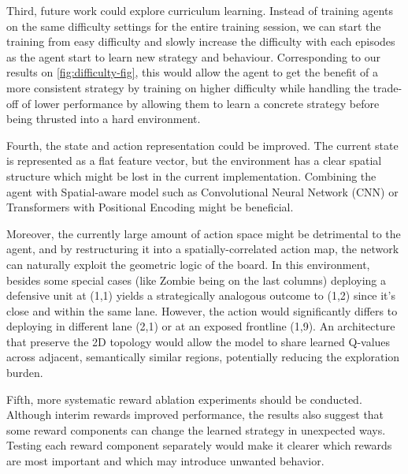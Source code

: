 \documentclass[conference,onecolumn]{IEEEtran}
\begin{document}
Third, future work could explore curriculum learning. Instead of training agents on the same difficulty settings for the entire training session, we can start the training from easy difficulty and slowly increase the difficulty with each episodes as the agent start to learn new strategy and behaviour. Corresponding to our results on \ref{fig:difficulty-fig}, this would allow the agent to get the benefit of a more consistent strategy by training on higher difficulty while handling the trade-off of lower performance by allowing them to learn a concrete strategy before being thrusted into a hard environment.

Fourth, the state and action representation could be improved. The current state is represented as a flat feature vector, but the environment has a clear spatial structure which might be lost in the current implementation. Combining the agent with Spatial-aware model such as Convolutional Neural Network (CNN) or Transformers with Positional Encoding might be beneficial. 

Moreover, the currently large amount of action space might be detrimental to the agent, and by restructuring it into a spatially-correlated action map, the network can naturally exploit the geometric logic of the board. In this environment, besides some special cases (like Zombie being on the last columns) deploying a defensive unit at (1,1) yields a strategically analogous outcome to (1,2) since it's close and within the same lane. However, the action would significantly differs to deploying in different lane (2,1) or at an exposed frontline (1,9). An architecture that preserve the 2D topology would allow the model to share learned Q-values across adjacent, semantically similar regions, potentially reducing the exploration burden. 



Fifth, more systematic reward ablation experiments should be conducted. Although interim rewards improved performance, the results also suggest that some reward components can change the learned strategy in unexpected ways. Testing each reward component separately would make it clearer which rewards are most important and which may introduce unwanted behavior.
\end{document}
